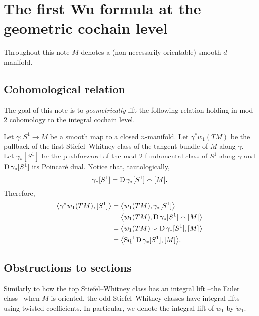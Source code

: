 
\section*{The first Wu formula at the geometric cochain level} \label{s:statement}

Throughout this note $M$ denotes a (non-necessarily orientable) smooth $d$-manifold. 

\subsection*{Cohomological relation}

The goal of this note is to \emph{geometrically} lift the following relation holding in mod 2 cohomology to the integral cochain level.

Let $\gamma \colon S^1 \to M$ be a smooth map to a closed $n$-manifold.
Let $\gamma^\ast w_1(TM)$ be the pullback of the first Stiefel--Whitney class of the tangent bundle of $M$ along $\gamma$.
Let $\gamma_\ast[S^1]$ be the pushforward of the mod 2 fundamental class of $S^1$ along $\gamma$ and $\dual \gamma_\ast[S^1]$ its Poincar\'e dual.
Notice that, tautologically,
\[
\gamma_\ast[S^1] = \dual \gamma_\ast[S^1] \smallfrown [M].
\]
Therefore,
\begin{equation} \label{e:cohomological_relation}
	\begin{split}
	\angles[\big]{\gamma^\ast w_1(TM), [S^1]} &=
	\angles[\big]{w_1(TM), \gamma_\ast [S^1]} \\ &=
	\angles[\big]{w_1(TM), \dual \gamma_\ast[S^1] \smallfrown [M]} \\ &=
	\angles[\big]{w_1(TM) \smallsmile \dual \gamma_\ast[S^1], [M]} \\ &=
	\angles[\big]{\Sq^1 \dual \gamma_\ast[S^1], [M]}.
	\end{split}
\end{equation}

\subsection*{Obstructions to sections}

Similarly to how the top Stiefel--Whitney class has an integral lift --the Euler class-- when $M$ is oriented, the odd Stiefel--Whitney classes have integral lifts using twisted coefficients.
In particular, we denote the integral lift of $w_1$ by $\widetilde w_1$.

